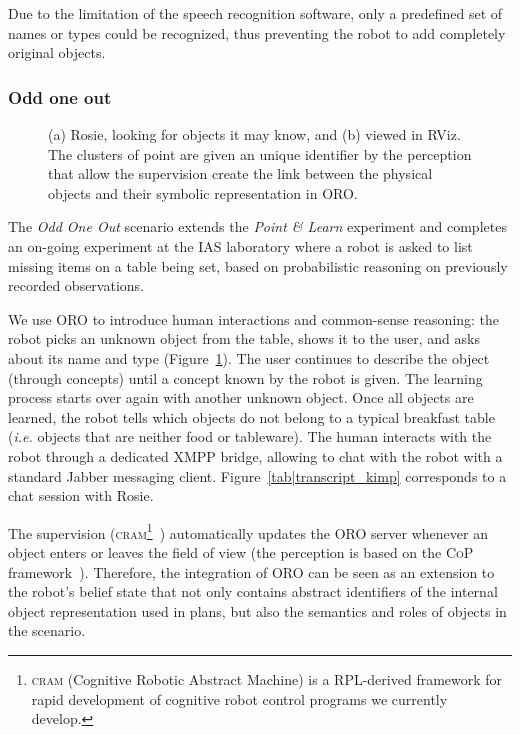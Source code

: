 Due to the limitation of the speech recognition software, only a predefined set
of names or types could be recognized, thus preventing the robot to add
completely original objects.

\subsubsection{Odd one out}
\label{expe|odd_one_out}

\begin{figure}
\centering


    \caption{(a) Rosie, looking for objects it may know, and (b) viewed in
    RViz. The clusters of point are given an unique identifier by the
    perception that allow the supervision create the link between the physical
    objects and their symbolic representation in ORO.}

\label{fig|kimpwatching}
\end{figure}


The \emph{Odd One Out} scenario extends the \textit{Point \& Learn} experiment
and completes an on-going experiment at the IAS laboratory where a robot is
asked to list missing items on a table being set, based on probabilistic
reasoning on previously recorded observations.

We use ORO to introduce human interactions and common-sense reasoning: the
robot picks an unknown object from the table, shows it to the user, and asks
about its name and type (Figure~\ref{fig|kimpwatching}). The user continues to
describe the object (through concepts) until a concept known by the robot is
given. The learning process starts over again with another unknown object. Once
all objects are learned, the robot tells which objects do not belong to a
typical breakfast table (\textit{i.e.} objects that are neither food or
tableware). The human interacts with the robot through a dedicated XMPP bridge,
allowing to chat with the robot with a standard Jabber messaging client.
Figure~\ref{tab|transcript_kimp} corresponds to a chat session with Rosie.

The supervision (\textsc{cram}\footnote{\textsc{cram} (Cognitive Robotic
Abstract Machine) is a RPL-derived framework for rapid development of cognitive
robot control programs we currently develop.}~\cite{Beetz2010}) automatically
updates the ORO server whenever an object enters or leaves the field of view
(the perception is based on the \textsc{CoP} framework~\cite{Klank2009}).
Therefore, the integration of ORO can be seen as an extension to the robot's
belief state that not only contains abstract identifiers of the internal object
representation used in plans, but also the semantics and roles of objects in
the scenario.

